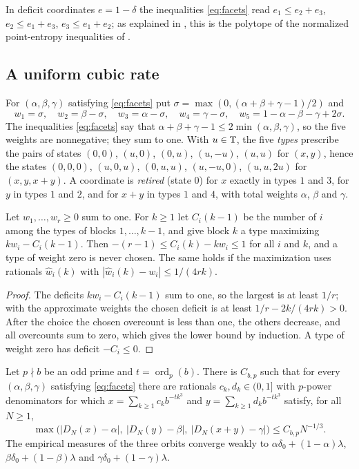 \documentclass[11pt]{article}
\DeclareMathOperator{\ord}{ord}
\begin{document}
In deficit coordinates $e=1-\delta$ the inequalities \eqref{eq:facets} read $e_1\le e_2+e_3$,
$e_2\le e_1+e_3$, $e_3\le e_1+e_2$; as explained in , this is the polytope of the
normalized point-entropy inequalities of \cite[Proposition~4.9]{BD25}.

\subsection{A uniform cubic rate}

For $(\alpha,\beta,\gamma)$ satisfying \eqref{eq:facets} put $\sigma=\max(0,(\alpha+\beta+\gamma-1)/2)$
and
\begin{equation}\label{eq:weights}
w_1=\sigma,\quad w_2=\beta-\sigma,\quad w_3=\alpha-\sigma,\quad w_4=\gamma-\sigma,\quad
w_5=1-\alpha-\beta-\gamma+2\sigma .
\end{equation}
The inequalities \eqref{eq:facets} say that $\alpha+\beta+\gamma-1\le2\min(\alpha,\beta,\gamma)$, so
the five weights are nonnegative; they sum to one. With $u\in\mathbb T$, the five \emph{types} prescribe the
pairs of states $(0,0)$, $(u,0)$, $(0,u)$, $(u,-u)$, $(u,u)$ for $(x,y)$, hence the states
$(0,0,0)$, $(u,0,u)$, $(0,u,u)$, $(u,-u,0)$, $(u,u,2u)$ for $(x,y,x+y)$. A coordinate is \emph{retired}
(state $0$) for $x$ exactly in types $1$ and $3$, for $y$ in types $1$ and $2$, and for $x+y$ in types $1$
and $4$, with total weights $\alpha$, $\beta$ and $\gamma$.

\begin{lemma}[Scheduler]\label{lem:scheduler}
Let $w_1,\ldots,w_r\ge0$ sum to one. For $k\ge1$ let $C_i(k-1)$ be the number of $i$ among the types
of blocks $1,\ldots,k-1$, and give block $k$ a type maximizing $kw_i-C_i(k-1)$. Then
$-(r-1)\le C_i(k)-kw_i\le1$ for all $i$ and $k$, and a type of weight zero is never chosen. The same
holds if the maximization uses rationals $\widehat w_i(k)$ with $|\widehat w_i(k)-w_i|\le1/(4rk)$.
\end{lemma}

\begin{proof}
The deficits $kw_i-C_i(k-1)$ sum to one, so the largest is at least $1/r$; with the approximate
weights the chosen deficit is at least $1/r-2k/(4rk)>0$. After the choice the chosen overcount is
less than one, the others decrease, and all overcounts sum to zero, which gives the lower bound by
induction. A type of weight zero has deficit $-C_i\le0$.
\end{proof}

\begin{theorem}\label{thm:additionrate}
Let $p\nmid b$ be an odd prime and $t=\ord_p(b)$. There is $C_{b,p}$ such that for every
$(\alpha,\beta,\gamma)$ satisfying \eqref{eq:facets} there are rationals $c_k,d_k\in(0,1]$ with
$p$-power denominators for which $x=\sum_{k\ge1}c_kb^{-tk^3}$ and $y=\sum_{k\ge1}d_kb^{-tk^3}$ satisfy, for all
$N\ge1$,
\[
\max\bigl(|D_N(x)-\alpha|,\ |D_N(y)-\beta|,\ |D_N(x+y)-\gamma|\bigr)\le C_{b,p}N^{-1/3}.
\]
The empirical measures of the three orbits converge weakly to $\alpha\delta_0+(1-\alpha)\lambda$,
$\beta\delta_0+(1-\beta)\lambda$ and $\gamma\delta_0+(1-\gamma)\lambda$.
\end{theorem}
\end{document}
